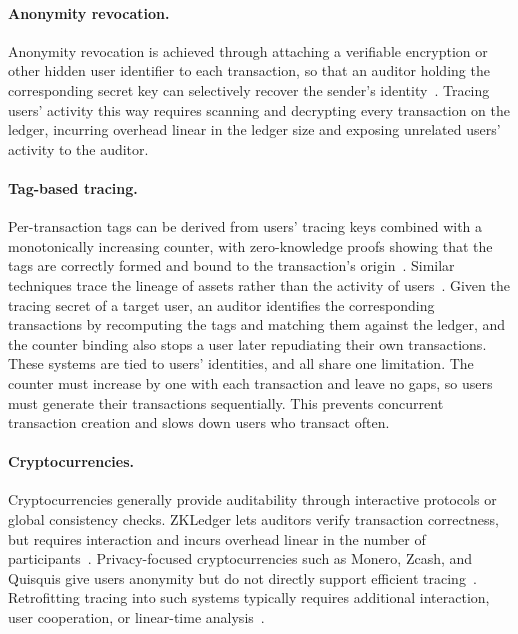 \paragraph{Anonymity revocation.} Anonymity revocation is achieved through attaching a verifiable encryption or
other hidden user identifier to each transaction, so that an auditor holding the
corresponding secret key can selectively recover the sender's
identity~\cite{SCN:CamHohLys06,EUROSP:CamLeh17,CANS:BDET21,INDOCRYPT:CDLP22}.  Tracing users'
activity this way requires scanning and decrypting every transaction on the
ledger, incurring overhead linear in the ledger size and exposing unrelated
users' activity to the auditor.

\paragraph{Tag-based tracing.} Per-transaction tags can be derived from users' tracing keys combined with a
monotonically increasing counter, with zero-knowledge proofs showing that the tags
are correctly formed and bound to the transaction's
origin~\cite{CCS:KiaKohSar22,CANS:SarKiaKoh24}. Similar techniques trace the
lineage of assets rather than the activity of users~\cite{FC:GarGreMie16}.
Given the tracing secret of a
target user, an auditor identifies the corresponding transactions by recomputing
the tags and matching them against the ledger, and the counter binding also
stops a user later repudiating their own transactions. These systems are
tied to users' identities, and all share one limitation. The counter must
increase by one with each transaction and leave no gaps, so users must generate
their transactions sequentially. This prevents
concurrent transaction creation and slows down users who transact often.

\paragraph{Cryptocurrencies.} Cryptocurrencies generally provide auditability through interactive protocols or
global consistency checks. ZKLedger lets auditors verify transaction
correctness, but requires interaction and incurs overhead linear in the number
of participants~\cite{EPRINT:NarVasVir18}.  Privacy-focused cryptocurrencies
such as Monero, Zcash, and Quisquis give users anonymity but do
not directly support efficient
tracing~\cite{EPRINT:Noether15,SP:BCGGMT14,AC:FMMO19,FC:BAZB20}.  Retrofitting
tracing into such systems typically requires additional interaction, user
cooperation, or linear-time analysis~\cite{ACNS:PBGP25}.

